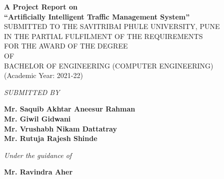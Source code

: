 \documentclass[openany,12pt]{report}
\begin{document}
\lhead{}
\chead{}
\setlength{\headrulewidth}{0.4pt}
\setlength{\footrulewidth}{0.4pt}
\fontsize{12}{15}
\begin{titlepage}
\begin{center}
{\bf A Project Report on} \\
\vspace{0.3in}
{\Large \bf ``Artificially Intelligent Traffic Management System''}\\
\vspace{0.3in}
SUBMITTED TO THE SAVITRIBAI PHULE UNIVERSITY, PUNE\\
IN THE PARTIAL FULFILMENT OF THE REQUIREMENTS \\
FOR THE AWARD OF THE DEGREE \\
\vspace{0.2in}
OF\\  
\vspace{0.2in}
BACHELOR OF ENGINEERING (COMPUTER ENGINEERING)\\
(Academic Year: 2021-22)\\
\vspace{0.2in}

{\it SUBMITTED BY}\\

\vspace{0.2in}

{\bf Mr. Saquib Akhtar Aneesur Rahman}\hspace*{\fill}{\bf (Div - B Roll No. 03)}\\
{\bf Mr. Giwil Gidwani }\hspace*{\fill}{\bf (Div - A Roll No. 24)}\\
{\bf Mr. Vrushabh Nikam Dattatray     }\hspace*{\fill}{\bf (Div - B Roll No. 50)}\\
{\bf Mr. Rutuja Rajesh Shinde    }\hspace*{\fill}{\bf (Div - B Roll No. 46)}\\

\vspace{0.4in}

{\it Under the guidance of}\\

\vspace{0.1in}

{\bf Mr. Ravindra Aher}\\
\vspace{0.4in}



\end{center}
\end{titlepage}
\end{document}
